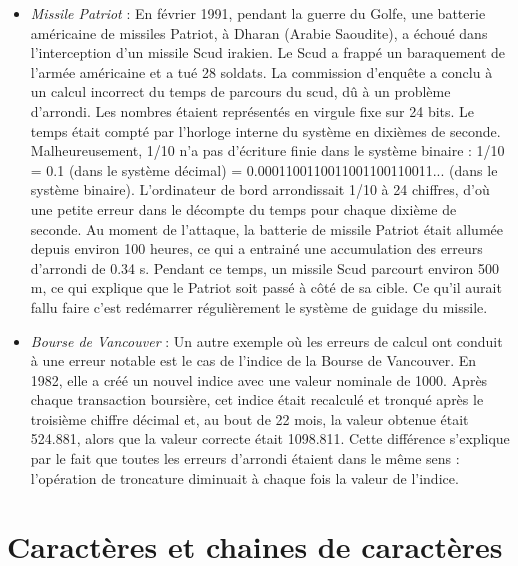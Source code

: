 \documentclass{magnolia}
\begin{document}
\begin{itemize}
\item \emph{Missile Patriot} : En février 1991, pendant la guerre du Golfe, une batterie américaine de
missiles Patriot, à Dharan (Arabie Saoudite), a échoué dans l'interception d'un
missile Scud irakien. Le Scud a frappé un baraquement de l'armée américaine
et a tué 28 soldats. La commission d'enquête a conclu à un calcul incorrect du
temps de parcours du scud, dû à un problème d'arrondi. Les nombres étaient représentés
en virgule fixe sur 24 bits. Le temps était compté par
l'horloge interne du système en dixièmes de seconde. Malheureusement, 1/10 n'a pas
d'écriture finie dans le système binaire : 1/10 = 0.1 (dans le système décimal)
= 0.0001100110011001100110011... (dans le système binaire). L'ordinateur de
bord arrondissait 1/10 à 24 chiffres, d'où une petite erreur dans le décompte
du temps pour chaque dixième de seconde. Au moment de l'attaque, la batterie
de missile Patriot était allumée depuis environ 100 heures, ce qui a entrainé
une accumulation des erreurs d'arrondi de 0.34 s. Pendant ce temps, un missile
Scud parcourt environ 500 m, ce qui explique que le Patriot soit passé à côté de
sa cible. Ce qu'il aurait fallu faire c'est redémarrer régulièrement le système
de guidage du missile.
\item \emph{Bourse de Vancouver} : Un autre exemple où les erreurs de calcul ont conduit à une erreur notable
est le cas de l'indice de la Bourse de Vancouver. En 1982, elle a créé un nouvel
indice avec une valeur nominale de 1000. Après chaque transaction boursière,
cet indice était recalculé et tronqué après le troisième chiffre décimal et, au bout
de 22 mois, la valeur obtenue était 524.881, alors que la valeur correcte était
1098.811. Cette différence s'explique par le fait que toutes les erreurs d'arrondi
étaient dans le même sens : l'opération de troncature diminuait à chaque fois la
valeur de l'indice.
\end{itemize}

\section{Caractères et chaines de caractères}
\end{document}
